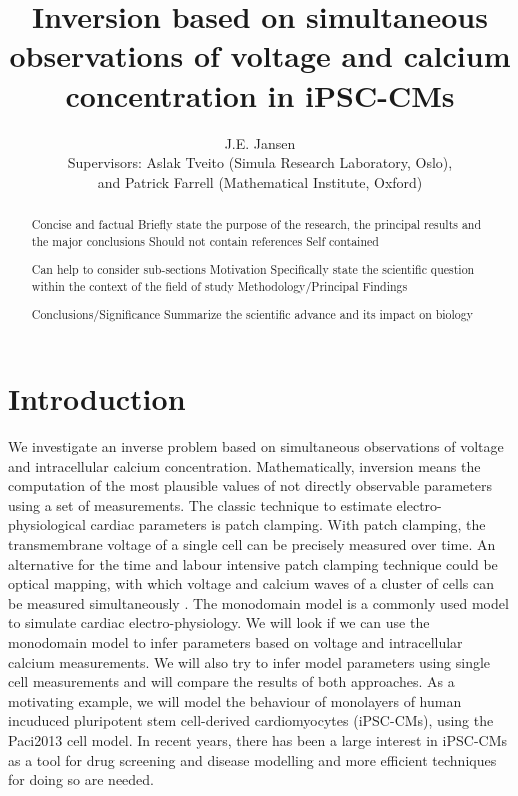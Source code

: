 \documentclass{article}
\title{Inversion based on simultaneous observations of voltage and calcium concentration in iPSC-CMs}
\author{J.E. Jansen \\[8 pt] Supervisors: Aslak Tveito (Simula Research Laboratory, Oslo), \\ and Patrick Farrell (Mathematical Institute, Oxford)}
\begin{document}
%
\maketitle
%
\begin{abstract}
Concise and factual 
Briefly state the purpose of the research, the principal results and the major conclusions
Should not contain references
Self contained

Can help to consider sub-sections
Motivation
Specifically state the scientific question within the context of the field of study 
Methodology/Principal Findings

Conclusions/Significance
Summarize the scientific advance and its impact on biology

\end{abstract}
\section{Introduction} \label{Introduction}
We investigate an inverse problem based on simultaneous observations of voltage and intracellular calcium concentration. 
Mathematically, inversion means the computation of the most plausible values of not directly observable parameters using a set of measurements. The classic technique to estimate electro-physiological cardiac parameters is patch clamping. With patch clamping, the transmembrane voltage of a single cell can be precisely measured over time. An alternative for the time and labour intensive patch clamping technique could be optical mapping, with which voltage and calcium waves of a cluster of cells can be measured simultaneously \cite{Lee2012}. The monodomain model is a commonly used model to simulate cardiac electro-physiology. We will look if we can use the monodomain model to infer parameters based on voltage and intracellular calcium measurements. We will also try to infer model parameters using single cell measurements and will compare the results of both approaches. As a motivating example, we will model the behaviour of monolayers of human incuduced pluripotent stem cell-derived cardiomyocytes (iPSC-CMs), using the Paci2013 cell model. In recent years, there has been a large interest in iPSC-CMs as a tool for drug screening and disease modelling and more efficient techniques for doing so are needed.
%
\end{document}
